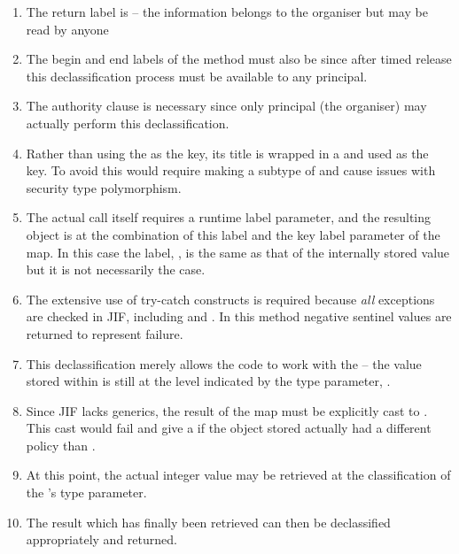 \begin{enumerate}
	\item The return label is  -- the information belongs to the organiser but may be read by anyone
	
	\item The begin and end labels of the method must also be  since after timed release this declassification process must be available to any principal.
	
	\item The authority clause is necessary since only principal  (the organiser) may actually perform this declassification.
	
	\item Rather than using the  as the key, its title is wrapped in a  and used as the key. To avoid this would require making  a subtype of  and cause issues with security type polymorphism.
	
	\item The actual  call itself requires a runtime label parameter, and the resulting object is at the combination of this label and the key label parameter of the map. In this case the label, , is the same as that of the internally stored value but it is not necessarily the case.
	
	\item The extensive use of try-catch constructs is required because \textit{all} exceptions are checked in JIF, including  and . In this method negative sentinel values are returned to represent failure.
	
	\item This declassification merely allows the code to work with the  -- the value stored within is still at the level indicated by the type parameter, .
	
	\item Since JIF lacks generics, the result of the map must be explicitly cast to . This cast would fail and give a  if the object stored actually had a different policy than .
	
	\item At this point, the actual integer value may be retrieved at the classification of the 's type parameter.
	
	\item The result which has finally been retrieved can then be declassified appropriately and returned.
	
\end{enumerate}

